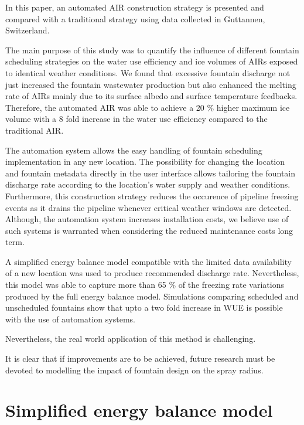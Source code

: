 \documentclass[tc, manuscript]{copernicus}
\begin{document}
\conclusions

In this paper, an automated AIR construction strategy is presented and compared with a traditional strategy
using data collected in Guttannen, Switzerland.

The main purpose of this study was to quantify the influence of different fountain scheduling strategies on the
water use efficiency and ice volumes of AIRs exposed to identical weather conditions. We found that excessive
fountain discharge not just increased the fountain wastewater production but also enhanced the melting rate of
AIRs mainly due to its surface albedo and surface temperature feedbacks. Therefore, the automated AIR was able
to achieve a 20 \% higher maximum ice volume with a 8 fold increase in the water use efficiency compared to the
traditional AIR.

The automation system allows the easy handling of fountain scheduling implementation in any new location. The
possibility for changing the location and fountain metadata directly in the user interface allows tailoring the
fountain discharge rate according to the location's water supply and weather conditions. Furthermore, this
construction strategy reduces the occurence of pipeline freezing events as it drains the pipeline whenever
critical weather windows are detected. Although, the automation system increases installation costs, we believe
use of such systems is warranted when considering the reduced maintenance costs long term.

A simplified energy balance model compatible with the limited data availability of a new location was used to
produce recommended discharge rate. Nevertheless, this model was able to capture more than 65 \% of the freezing
rate variations produced by the full energy balance model. Simulations comparing scheduled and unscheduled
fountains show that upto a two fold increase in WUE is possible with the use of automation systems.

Nevertheless, the real world application of this method is challenging. 

It is clear that if improvements are to be achieved, future research must be devoted to modelling the impact of
fountain design on the spray radius.

\appendix

\section{Simplified energy balance model}
\end{document}
